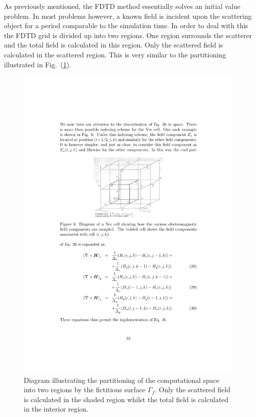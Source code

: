 \documentclass[a4paper, 12pt]{article}
\newcommand{\rfig}[1]{Fig.\ (\ref{#1})}
\begin{document}
	As previously mentioned, the FDTD method essentially solves an initial
	value problem. In most problems however, a known field is incident upon
	the scattering object for a period comparable to the simulation time. In order to deal with this the FDTD grid is
	divided up into two regions. One region surrounds the scatterer and
	the total field is calculated in this region. Only the scattered field
	is calculated in the scattered region. This is very similar to the
	partitioning illustrated in \rfig{fig:numermeth:scat_tot}. \begin{figure}[!h]
		\centering
		\includegraphics[width=\textwidth]{figures/5.pdf}
		\caption{Diagram illustrating the partitioning of the computational
			space into two regions by the fictitious surface $\Gamma_f$. Only
			the scattered field is calculated in the shaded region whilst the
			total field is calculated in the interior region.}
		\label{fig:numermeth:scat_tot}
	\end{figure}
\end{document}
